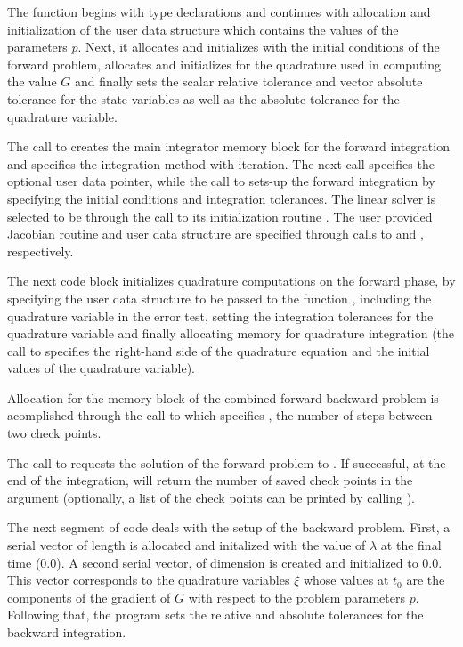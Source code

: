 The  function begins with type declarations and continues with
allocation and initialization of the user data structure which contains the values 
of the parameters $p$. Next, it allocates and
initializes  with the initial conditions of the forward problem, allocates and 
initializes  for the quadrature used in computing the value $G$ and finally
sets the scalar relative tolerance  and vector absolute tolerance 
for the state variables as well as the absolute tolerance for the quadrature variable.

The call to  creates the main integrator memory block for the 
forward integration and specifies the  integration method with 
 iteration. 
The next call specifies the optional user data pointer, while the call to  
sets-up the forward integration by specifying the initial conditions and integration 
tolerances. The linear solver is selected to be {\cvdense} through the call to its 
initialization routine . The user provided Jacobian routine 
and user data structure  are specified through calls to  and
, respectively.

The next code block initializes quadrature computations on the forward phase, by
specifying the user data structure to be passed to the function ,
including the quadrature variable in the error test, setting the integration tolerances
for the quadrature variable and finally allocating {\cvodes} memory for quadrature
integration (the call to  specifies the right-hand side
of the quadrature equation and the initial values of the quadrature variable).

Allocation for the memory block of the combined forward-backward problem is
acomplished through the call to  which specifies ,
the number of steps between two check points.

The call to  requests the solution of the forward problem to .
If successful, at the end of the integration,  will return the number
of saved check points in the argument  (optionally, a list of the check points
can be printed by calling ).

The next segment of code deals with the setup of the backward problem. 
First, a serial vector  of length  is allocated and initalized with the
value of $\lambda$ at the final time ($0.0$). 
A second serial vector,  of dimension  is created and initialized to $0.0$.
This vector corresponds to the quadrature variables $\xi$ whose values at $t_0$ 
are the components of the gradient of $G$ with respect to the problem parameters $p$.
Following that, the program sets the relative and absolute tolerances for the backward integration.

